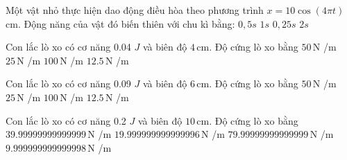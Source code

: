 \begin{ex}
Một vật nhỏ thực hiện dao động điều hòa theo phương trình $x=10\cos(4\pi t)$ cm. Động năng của vật đó biến thiên với chu kì bằng:
\choice
{$0,5s$}
{$1s$}
{\True $0,25s$}
{$2s$}
\end{ex}

\begin{ex}
Con lắc lò xo có cơ năng 0.04 $J$ và biên độ $4\,\text{cm}$. Độ cứng lò xo bằng
\choice
{\True $50\,\text{N}$ /m}
{$25\,\text{N}$ /m}
{$100\,\text{N}$ /m}
{$12.5\,\text{N}$ /m}
\end{ex}

\begin{ex}
Con lắc lò xo có cơ năng 0.09 $J$ và biên độ $6\,\text{cm}$. Độ cứng lò xo bằng
\choice
{\True $50\,\text{N}$ /m}
{$25\,\text{N}$ /m}
{$100\,\text{N}$ /m}
{$12.5\,\text{N}$ /m}
\end{ex}

\begin{ex}
Con lắc lò xo có cơ năng 0.2 $J$ và biên độ $10\,\text{cm}$. Độ cứng lò xo bằng
\choice
{\True $39.99999999999999\,\text{N}$ /m}
{$19.999999999999996\,\text{N}$ /m}
{$79.99999999999999\,\text{N}$ /m}
{$9.999999999999998\,\text{N}$ /m}
\end{ex}

